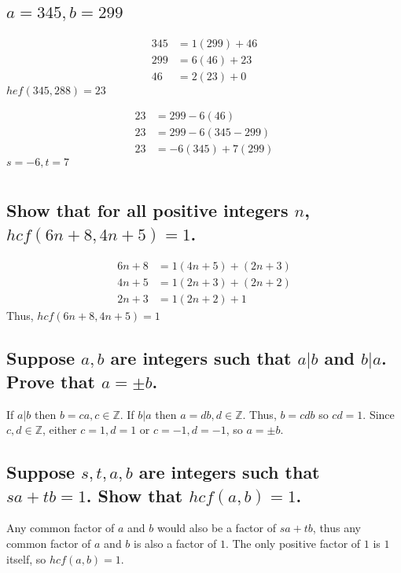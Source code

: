 \documentclass[12pt]{article}
\begin{document}
\subsection{$a=345,b=299$}
\begin{align*}
    345&=1(299)+46\\
    299&=6(46)+23\\
    46&=2(23)+0
\end{align*}
$hef(345,288)=23$

\begin{align*}
    23&=299-6(46)\\
    23&=299-6(345-299)\\
    23&=-6(345)+7(299)
\end{align*}
$s=-6,t=7$


\setcounter{section}{3}

\section{}
\subsection{Show that for all positive integers $n$, $hcf(6n+8,4n+5)=1$.}
\begin{align*}
    6n+8&=1(4n+5)+(2n+3)\\
    4n+5&=1(2n+3)+(2n+2)\\
    2n+3&=1(2n+2)+1
\end{align*}
Thus, $hcf(6n+8,4n+5)=1$

\subsection{Suppose $a,b$ are integers such that $a|b$ and $b|a$. Prove that $a=\pm b$.}
If $a|b$ then $b=ca,c\in \mathds{Z}$. If $b|a$ then $a=db,d\in \mathds{Z}$. Thus, $b=cdb$ so $cd=1$.
Since $c,d \in \mathds{Z}$, either $c=1,d=1$ or $c=-1,d=-1$, so $a=\pm b$.

\subsection{Suppose $s,t,a,b$ are integers such that $sa+tb=1$. Show that $hcf(a,b)=1$.}
Any common factor of $a$ and $b$ would also be a factor of $sa+tb$,
thus any common factor of $a$ and $b$ is also a factor of $1$.
The only positive factor of $1$ is $1$ itself, so $hcf(a,b)=1$.


\section{}
\end{document}
